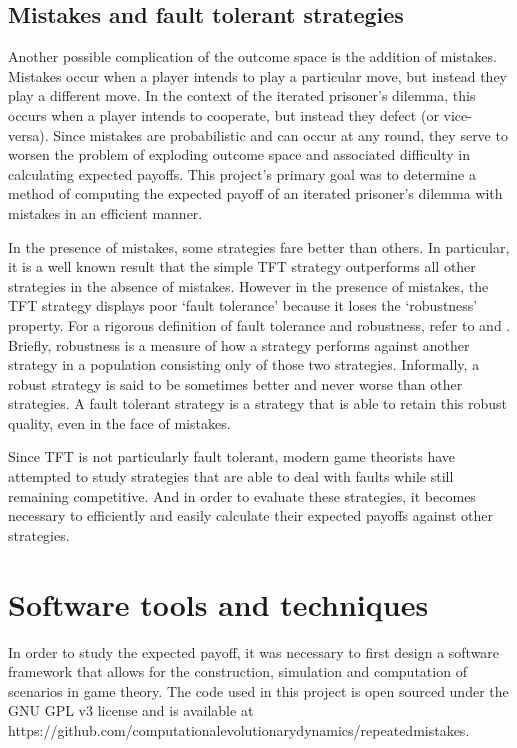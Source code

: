 \documentclass[a4paper,12pt]{article}
\begin{document}
\subsection{Mistakes and fault tolerant strategies}

Another possible complication of the outcome space is the addition of mistakes.
Mistakes occur when a player intends to play a particular move, but instead they play a different move.
In the context of the iterated prisoner's dilemma, this occurs when a player intends to cooperate, but instead they defect (or vice-versa).
Since mistakes are probabilistic and can occur at any round, they serve to worsen the problem of exploding outcome space and associated difficulty in calculating expected payoffs.
This project's primary goal was to determine a method of computing the expected payoff of an iterated prisoner's dilemma with mistakes in an efficient manner.

In the presence of mistakes, some strategies fare better than others.
In particular, it is a well known result \cite{axelrod} that the simple TFT strategy outperforms all other strategies in the absence of mistakes.
However in the presence of mistakes, the TFT strategy displays poor `fault tolerance' because it loses the `robustness' property.
For a rigorous definition of fault tolerance and robustness, refer to \cite{pelc} and \cite{pelcpelc}.
Briefly, robustness is a measure of how a strategy performs against another strategy in a population consisting only of those two strategies.
Informally, a robust strategy is said to be sometimes better and never worse than other strategies.
A fault tolerant strategy is a strategy that is able to retain this robust quality, even in the face of mistakes.

Since TFT is not particularly fault tolerant, modern game theorists have attempted to study strategies that are able to deal with faults while still remaining competitive.
And in order to evaluate these strategies, it becomes necessary to efficiently and easily calculate their expected payoffs against other strategies.

\section{Software tools and techniques}

In order to study the expected payoff, it was necessary to first design a software framework that allows for the construction, simulation and computation of scenarios in game theory.
The code used in this project is open sourced under the GNU GPL v3 license and is available at https://github.com/computationalevolutionarydynamics/repeatedmistakes.
\end{document}
